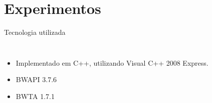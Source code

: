 \documentclass{beamer}
\begin{document}
\section{Experimentos}
\begin{frame}{Tecnologia utilizada}
\begin{columns}
\begin{itemize}
  \item Implementado em C++, utilizando Visual C++ 2008 Express.
  \item BWAPI 3.7.6
  \item BWTA 1.7.1
\end{itemize}

\end{columns}
\end{frame}
\end{document}
